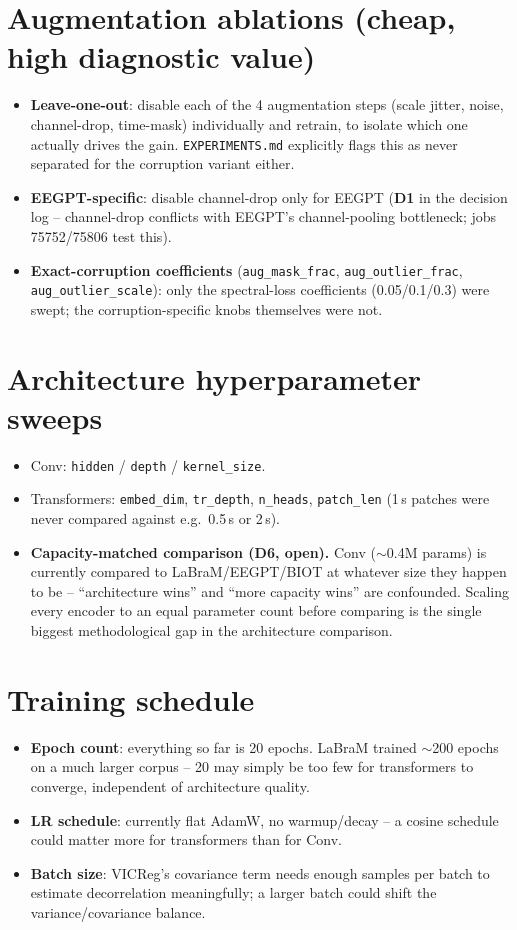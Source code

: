 \documentclass[10pt,a4paper]{article}
\begin{document}
\section{Augmentation ablations (cheap, high diagnostic value)}
\begin{itemize}
  \item \textbf{Leave-one-out}: disable each of the 4 augmentation steps (scale
  jitter, noise, channel-drop, time-mask) individually and retrain, to isolate which
  one actually drives the gain. \texttt{EXPERIMENTS.md} explicitly flags this as never
  separated for the corruption variant either.
  \item \textbf{EEGPT-specific}: disable channel-drop only for EEGPT
  (\textbf{D1} in the decision log -- channel-drop conflicts with EEGPT's
  channel-pooling bottleneck; jobs 75752/75806 test this).
  \item \textbf{Exact-corruption coefficients} (\texttt{aug\_mask\_frac},
  \texttt{aug\_outlier\_frac}, \texttt{aug\_outlier\_scale}): only the spectral-loss
  coefficients (0.05/0.1/0.3) were swept; the corruption-specific knobs themselves
  were not.
\end{itemize}

\section{Architecture hyperparameter sweeps}
\begin{itemize}
  \item Conv: \texttt{hidden} / \texttt{depth} / \texttt{kernel\_size}.
  \item Transformers: \texttt{embed\_dim}, \texttt{tr\_depth}, \texttt{n\_heads},
  \texttt{patch\_len} (1\,s patches were never compared against e.g.\ 0.5\,s or 2\,s).
  \item \textbf{Capacity-matched comparison (D6, open).} Conv ($\sim$0.4M params) is
  currently compared to LaBraM/EEGPT/BIOT at whatever size they happen to be --
  ``architecture wins'' and ``more capacity wins'' are confounded. Scaling every
  encoder to an equal parameter count before comparing is the single biggest
  methodological gap in the architecture comparison.
\end{itemize}

\section{Training schedule}
\begin{itemize}
  \item \textbf{Epoch count}: everything so far is 20 epochs. LaBraM trained
  $\sim$200 epochs on a much larger corpus -- 20 may simply be too few for
  transformers to converge, independent of architecture quality.
  \item \textbf{LR schedule}: currently flat AdamW, no warmup/decay -- a cosine
  schedule could matter more for transformers than for Conv.
  \item \textbf{Batch size}: VICReg's covariance term needs enough samples per batch
  to estimate decorrelation meaningfully; a larger batch could shift the
  variance/covariance balance.
\end{itemize}
\end{document}
